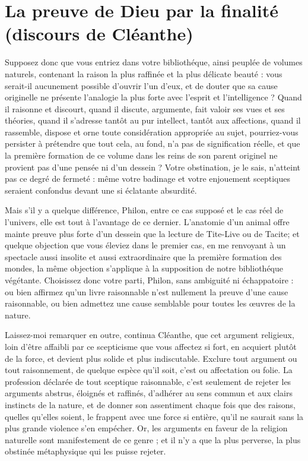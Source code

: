 
\section{La preuve de Dieu par la finalité (discours de Cléanthe)}
Supposez donc que vous entriez dans votre bibliothéque,
ainsi peuplée de volumes naturels, contenant la
raison la plus raffinée et la plus délicate beauté : vous
serait-il aucunement possible d’ouvrir l’un d’eux, et de
douter que sa cause originelle ne présente l'analogie la
plus forte avec l’esprit et l'intelligence ? Quand il raisonne
et discourt, quand il discute, argumente, fait valoir ses
vues et ses théories, quand il s’adresse tantôt au pur
intellect, tantôt aux affections, quand il rassemble, dispose
et orne toute considération appropriée au sujet,
pourriez-vous persister à prétendre que tout cela, au fond,
n’a pas de signification réelle, et que la première formation
de ce volume dans les reins de son parent originel ne
provient pas d’une pensée ni d’un dessein ? Votre obstination,
je le sais, n’atteint pas ce degré de fermeté : même
votre badinage et votre enjouement sceptiques seraient
confondus devant une si éclatante absurdité.

Mais s’il y a quelque différence, Philon, entre ce cas
supposé et le cas réel de l’univers, elle est tout à l’avantage
de ce dernier. L’anatomie d’un animal offre mainte preuve
plus forte d’un dessein que la lecture de Tite-Live ou de
Tacite; et quelque objection que vous éleviez dans le
premier cas, en me renvoyant à un spectacle aussi insolite
et aussi extraordinaire que la première formation des
mondes, la même objection s’applique à la supposition
de notre bibliothéque végétante. Choisissez donc votre
parti, Philon, sans ambiguité ni échappatoire : ou bien
affirmez qu’un livre raisonnable n’est nullement la preuve
d'une cause raisonnable, ou bien admettez une cause
semblable pour toutes les {\oe}uvres de la nature.

Laissez-moi remarquer en outre, continua Cléanthe,
que cet argument religieux, loin d’être affaibli par ce
scepticisme que vous affectez si fort, en acquiert plutôt
de la force, et devient plus solide et plus indiscutable.
Exclure tout argument ou tout raisonnement, de quelque
espèce qu’il soit, c’est ou affectation ou folie. La profession
déclarée de tout sceptique raisonnable, c’est seulement de
rejeter les arguments abstrus, éloignés et raffinés, d’adhérer
au sens commun et aux clairs instincts de la nature, et
de donner son assentiment chaque fois que des raisons,
quelles qu’elles soient, le frappent avec une force si entière,
qu’il ne saurait sans la plus grande violence s’en empécher.
Or, les arguments en faveur de la religion naturelle sont
manifestement de ce genre ; et il n’y a que la plus perverse,
la plus obstinée métaphysique qui les puisse rejeter.

